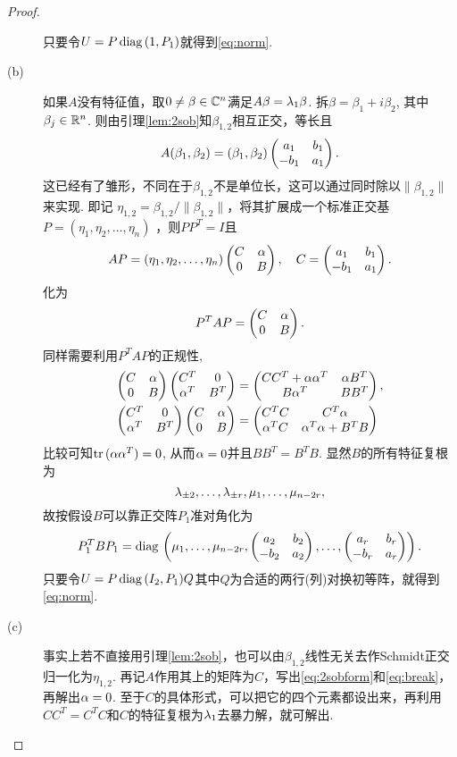 \begin{proof}
\begin{description}
		只要令$U=P\operatorname*{diag\,}(1,P_1)$就得到\eqref{eq:norm}.
		\item[(b)]
		如果$A$没有特征值，取$0\neq \beta\in \mathbb{C}^n$满足$A\beta=\lambda_1 \beta$. 拆$\beta=\beta_1+i\beta_2$, 其中$\beta_j\in\mathbb{R}^n$. 则由引理\ref{lem:2sob}知$\beta_{1,2}$相互正交，等长且
		\[A(\beta_1,\beta_2)=(\beta_1,\beta_2)\begin{pmatrix} a_1 & b_1\\ -b_1 & a_1\end{pmatrix}.\]
		这已经有了雏形，不同在于$\beta_{1,2}$不是单位长，这可以通过同时除以$\|\beta_{1,2}\|$来实现. 即记
		$\eta_{1,2}=\beta_{1,2}/\|\beta_{1,2}\|$，将其扩展成一个标准正交基$P=(\eta_1,\eta_2,\dots,\eta_n)$
		，则$PP^T=I$且
		\[
		AP=(\eta_1,\eta_2,\dots,\eta_n)
		\begin{pmatrix} C & \alpha\\ 0 & B\end{pmatrix},\quad C=\begin{pmatrix} a_1 & b_1\\ -b_1 & a_1\end{pmatrix}.
		\]
		化为
		\begin{equation}\label{eq:2sobform}
		P^TAP=\begin{pmatrix} C & \alpha\\ 0 & B\end{pmatrix}.
		\end{equation}
		同样需要利用$P^TAP$的正规性,
		\begin{equation}\label{eq:break}
		\begin{aligned}
			\begin{pmatrix} C & \alpha\\ 0 & B\end{pmatrix}
			\begin{pmatrix} C^T & 0\\ \alpha^T & B^T\end{pmatrix}&=
			\begin{pmatrix} CC^T+\alpha\alpha^T & \alpha B^T\\ B\alpha^T & BB^T\end{pmatrix},\\
			\begin{pmatrix} C^T & 0\\ \alpha^T & B^T\end{pmatrix}
			\begin{pmatrix} C & \alpha\\ 0 & B\end{pmatrix}&=
			\begin{pmatrix} C^TC & C^T\alpha\\ \alpha^TC & \alpha^T\alpha+B^TB\end{pmatrix}
		\end{aligned}
		\end{equation}
		比较可知$\operatorname*{tr\,}(\alpha\alpha^T)=0$, 从而$\alpha=0$并且$BB^T=B^TB$. 显然$B$的所有特征复根为
		\[\lambda_{\pm 2},\dots,\lambda_{\pm r},\mu_1,\dots,\mu_{n-2r},\]
		故按假设$B$可以靠正交阵$P_1$准对角化为
		\[P_1^T B P_1=\operatorname*{diag\,}\left(\mu_1,\dots,\mu_{n-2r},
		\begin{pmatrix} a_2 & b_2\\ -b_2 & a_2\end{pmatrix},\dots,\begin{pmatrix} a_r & b_r\\ -b_r & a_r\end{pmatrix}\right).\]
		只要令$U=P\operatorname*{diag\,}(I_2,P_1)Q$其中$Q$为合适的两行(列)对换初等阵，就得到\eqref{eq:norm}.
		\item[(c)] 事实上若不直接用引理\ref{lem:2sob}，也可以由$\beta_{1,2}$线性无关去作Schmidt正交归一化为$\eta_{1,2}$. 再记$A$作用其上的矩阵为$C$，写出\eqref{eq:2sobform}和\eqref{eq:break}，再解出$\alpha=0$. 至于$C$的具体形式，可以把它的四个元素都设出来，再利用$CC^T=C^TC$和$C$的特征复根为$\lambda_1$去暴力解，就可解出.
	\end{description}
\end{proof}
